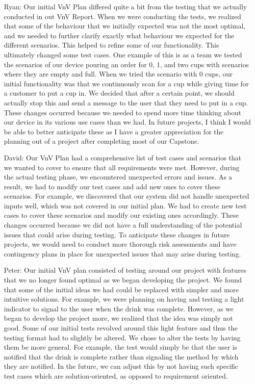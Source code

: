 \documentclass[12pt, titlepage]{article}
\begin{document}
\begin{enumerate}
  Ryan: Our initial VnV Plan differed quite a bit from the testing that we actually conducted in out VnV Report. When we were conducting the tests, we realized that some of the behaviour that we initially expected was not the most optimal, and we needed to further clarify exactly what behaviour we expected for the different scenarios. This helped to refine some of our functionality. This ultimately changed some test cases. One example of this is as a team we tested the scenarios of our device pouring an order for 0, 1, and two cups with scenarios where they are empty and full. When we tried the scenario with 0 cups, our initial functionality was that we continuously scan for a cup while giving time for a customer to put a cup in. We decided that after a certain point, we should actually stop this and send a message to the user that they need to put in a cup. These changes occurred because we needed to spend more time thinking about our device in its various use cases than we had. In future projects, I think I would be able to better anticipate these as I have a greater appreciation for the planning out of a project after completing most of our Capstone.

  David: Our VnV Plan had a comprehensive list of test cases and scenarios that we wanted to cover to ensure that all requirements were met. However, during the actual testing phase, we encountered unexpected errors and issues. As a result, we had to modify our test cases and add new ones to cover these scenarios. For example, we discovered that our system did not handle unexpected inputs well, which was not covered in our initial plan. We had to create new test cases to cover these scenarios and modify our existing ones accordingly. These changes occurred because we did not have a full understanding of the potential issues that could arise during testing. To anticipate these changes in future projects, we would need to conduct more thorough risk assessments and have contingency plans in place for unexpected issues that may arise during testing.

  Peter: Our initial VnV plan consisted of testing around our project with features that we no longer found optimal as we began developing the project. We found that some of the initial ideas we had could be replaced with simpler and more intuitive solutions. For example, we were planning on having and testing a light indicator to signal to the user when the drink was complete. However, as we began to develop the project more, we realized that the idea was simply not good. Some of our initial tests revolved around this light feature and thus the testing format had to slightly be altered. We chose to alter the tests by having them be more general. For example, the test would simply be that the user is notified that the drink is complete rather than signaling the method by which they are notified. In the future, we can adjust this by not having such specific test cases which are solution-oriented, as opposed to requirement oriented.


\end{enumerate}
\end{document}
